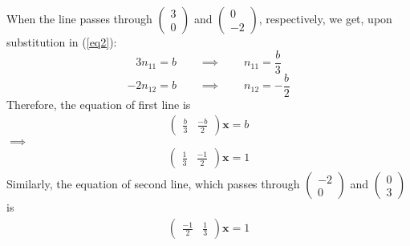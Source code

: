 \documentclass[12pt]{article}
\newcommand{\myvec}[1]{\ensuremath{\begin{pmatrix}#1\end{pmatrix}}}
\begin{document}
\noindent
When the line passes through $\myvec{3 \\ 0}$ and $\myvec{0 \\ -2}$, 
respectively,
we get, upon substitution in (\ref{eq2}):
	\[ 3 n_{11} = b \qquad \implies \qquad n_{11} = \frac{b}{3} \]
	\[-2 n_{12} = b \qquad \implies \qquad n_{12} =-\frac{b}{2} \]
Therefore, the equation of first line is
\begin{align*}
	\myvec{\frac{b}{3} & \frac{-b}{2} } {\mathbf{x}} = b
\end{align*}
%
$\implies$
\begin{align}
	\myvec{ \frac{1}{3} & \frac{-1}{2} } {\mathbf{x}} = 1
\end{align}
Similarly, the equation of second line, which passes through 
$\myvec{ -2 \\ 0}$ and $\myvec{ 0 \\ 3}$ 
is 
\begin{align}
	\myvec{ \frac{-1}{2} & \frac{1}{3} } {\mathbf{x}} = 1
\end{align}

\end{document}

